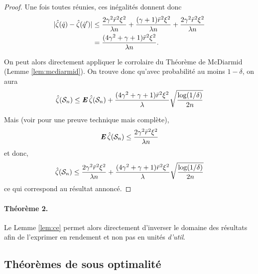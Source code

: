 \begin{proof}
  Une fois toutes réunies, ces inégalités donnent donc
  \begin{align}
    |\hat\zeta(\hat q) - \hat\zeta(\hat q')| &\leq \frac{2\gamma^2\bar r^2\xi^2}{\lambda n} + \frac{(\gamma+1)\bar r^2\xi^2}{\lambda n}
                                 + \frac{2\gamma^2\bar r^2\xi^2}{\lambda n}\\
                               & = \frac{(4\gamma^2 + \gamma + 1)\bar r^2\xi^2}{\lambda n}.
  \end{align}

  On peut alors directement appliquer le corrolaire du Théorème de McDiarmid (Lemme
  \ref{lem:mcdiarmid}). On trouve donc qu'avec probabilité au moins $1-\delta$, on aura
  \begin{equation}
    \hat\zeta(\mathcal S_n) \leq \operatorname{\mbox{\textbf{\textit{E}}}}\hat\zeta(\mathcal S_n) + \frac{(4\gamma^2 + \gamma +
      1)\bar r^2\xi^2}{\lambda}\sqrt{\frac{\log(1/\delta)}{2n}} 
  \end{equation}

  Mais (voir \cite{mohri2012foundations} pour une preuve technique mais complète),
  \begin{equation}
    \operatorname{\mbox{\textbf{\textit{E}}}}\hat\zeta(\mathcal S_n) \leq \frac{2\gamma^2\bar r^2\xi^2}{\lambda n}
  \end{equation}
  et donc,
  \begin{equation}
    \hat\zeta(\mathcal S_n) \leq \frac{2\gamma^2\bar r^2\xi^2}{\lambda n} + \frac{(4\gamma^2 + \gamma +
        1)\bar r^2\xi^2}{\lambda}\sqrt{\frac{\log(1/\delta)}{2n}}
  \end{equation}
ce qui correspond au résultat annoncé.
\end{proof}

\paragraph{Théorème 2.}

Le Lemme \ref{lem:ce} permet alors directement d'inverser le domaine des résultats afin de
l'exprimer en rendement et non pas en unités \textit{d'util}.


\subsection{Théorèmes de sous optimalité}

